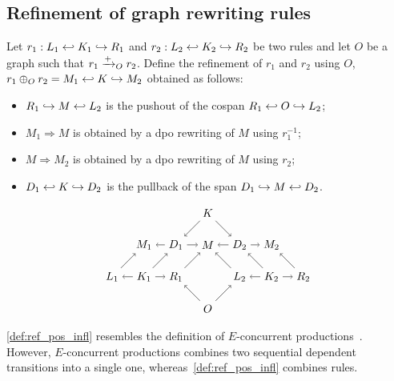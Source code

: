 \subsection{Refinement of graph rewriting rules}

\begin{definition}
  \label{def:ref_pos_infl}
  Let $r_1:L_1\hookleftarrow K_1 \hookrightarrow R_1$ and $r_2:L_2\hookleftarrow K_2 \hookrightarrow R_2$ be two rules and let $O$ be a graph such that $r_1\mathrel{\xrightarrow{+}}_O r_2$. Define the refinement of $r_1$ and $r_2$ using $O$, $r_1\oplus_O r_2 = M_1\hookleftarrow K\hookrightarrow M_2$ obtained as follows:
  \begin{itemize}
  \item $R_1\hookrightarrow M\hookleftarrow L_2$ is the pushout of the cospan $R_1\hookleftarrow O \hookrightarrow L_2$;
  \item $M_1\Rightarrow M$ is obtained by a dpo rewriting of $M$ using $r_1^{-1}$;
  \item $M\Rightarrow M_2$ is obtained by a dpo rewriting of $M$ using $r_2$;
  \item $D_1\hookleftarrow K\hookrightarrow D_2$ is the pullback of the span $D_1\hookrightarrow M \hookleftarrow D_2$.
  \end{itemize}
  \[
  \begin{tikzpicture} %
  \node (o) at (0,-1) {\(O\)};
  \node (m) at (0,1) {\(M\)};
  \node (d2) at (1,1) {\(D_2\)};
  \node (m2) at (2,1) {\(M_2\)};
  \node (d1) at (-1,1) {\(D_1\)};
  \node (m1) at (-2,1) {\(M_1\)};
  \node (r1) at (-1,0) {\(R_1\)};
  \node (k1) at (-2,0) {\(K_1\)};
  \node (l1) at (-3,0) {\(L_1\)};
  \node (l2) at (1,0) {\(L_2\)};
  \node (k2) at (2,0) {\(K_2\)};
  \node (r2) at (3,0) {\(R_2\)};
  \node (k) at (0,2) {\(K\)};
  \draw [->] (o) -- (r1);
  \draw [->] (o) -- (l2);
  \draw [->] (r1) -- (m);
  \draw [->] (k1) -- (r1);
  \draw [->] (k1) -- (l1);
  \draw [->] (k1) -- (d1);
  \draw [->] (l1) -- (m1);
  \draw [->] (l2) -- (m);
  \draw [->] (k2) -- (r2);
  \draw [->] (k2) -- (l2);
  \draw [->] (k2) -- (d2);
  \draw [->] (r2) -- (m2);
  \draw [->] (d1) -- (m);
  \draw [->] (d1) -- (m1);
  \draw [->] (d2) -- (m);
  \draw [->] (d2) -- (m2);
  \draw [->] (k) -- (d1);
  \draw [->] (k) -- (d2);
\end{tikzpicture}
\]
\end{definition}

\autoref{def:ref_pos_infl} resembles the definition of $E$-concurrent productions~\cite{AlgebraicGR}. However, $E$-concurrent productions combines two sequential dependent transitions into a single one, whereas~\autoref{def:ref_pos_infl} combines rules.

